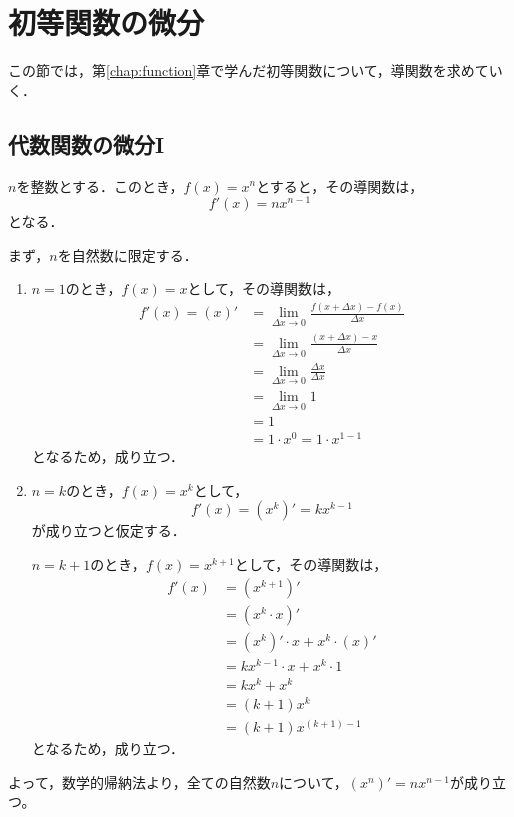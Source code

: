 \newpage
\section{初等関数の微分}
この節では，第\ref{chap:function}章で学んだ初等関数について，導関数を求めていく．
\subsection{代数関数の微分I}
\begin{theorem}
	$n$を整数とする．このとき，$f(x) = x^n$とすると，その導関数は，
	\[
		f'(x) = nx^{n-1}
	\]
	となる．
\end{theorem}
\begin{Proof}
	まず，$n$を自然数に限定する．
	\begin{enumerate}[(1)]
		\item $n = 1$のとき，$f(x) = x$として，その導関数は，
		\begin{align*}
			f'(x) = (x)' &= \lim\limits_{\Delta x \to 0}\frac{f\left(x+\Delta x\right) -f(x)}{\Delta x} \\
			&= \lim\limits_{\Delta x \to 0}\frac{\left(x+\Delta x\right) -x}{\Delta x} \\
			&= \lim\limits_{\Delta x \to 0}\frac{\Delta x}{\Delta x} \\
			&= \lim\limits_{\Delta x \to 0} 1 \\
			&= 1 \\
			&= 1 \cdot x^0 = 1\cdot x^{1-1}
		\end{align*}
		となるため，成り立つ．
		\item $n = k$のとき，$f(x) = x^k$として，
		\[
			f'(x) = \left(x^k\right)' = kx^{k-1}
		\]
		が成り立つと仮定する．
		
		$n = k+1$のとき，$f(x) = x^{k+1}$として，その導関数は，
		\begin{align*}
			f'(x) &= \left(x^{k+1}\right)' \\
			&= \left(x^k\cdot x\right)' \\
			&= \left(x^k\right)'\cdot x + x^k \cdot \left(x\right)' \\
			&= kx^{k-1}\cdot x + x^k \cdot 1 \\
			&= kx^k + x^k \\
			&= (k+1)x^k \\
			&= (k+1)x^{(k+1)-1}
		\end{align*}
		となるため，成り立つ．
	\end{enumerate}
	よって，数学的帰納法より，全ての自然数$n$について，$\left(x^n\right)' = nx^{n-1}$が成り立つ。
	

\end{Proof}
